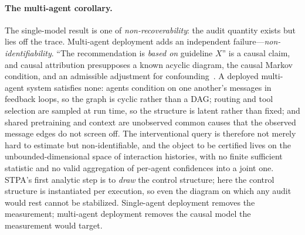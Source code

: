 \paragraph{The multi-agent corollary.} The single-model result is one of \emph{non-recoverability}: the audit quantity exists but lies off the trace. Multi-agent deployment adds an independent failure---\emph{non-identifiability}. ``The recommendation is \emph{based on} guideline $X$'' is a causal claim, and causal attribution presupposes a known acyclic diagram, the causal Markov condition, and an admissible adjustment for confounding~\cite{pearl2009}. A deployed multi-agent system satisfies none: agents condition on one another's messages in feedback loops, so the graph is cyclic rather than a DAG; routing and tool selection are sampled at run time, so the structure is latent rather than fixed; and shared pretraining and context are unobserved common causes that the observed message edges do not screen off. The interventional query is therefore not merely hard to estimate but non-identifiable, and the object to be certified lives on the unbounded-dimensional space of interaction histories, with no finite sufficient statistic and no valid aggregation of per-agent confidences into a joint one. STPA's first analytic step is to \emph{draw} the control structure; here the control structure is instantiated per execution, so even the diagram on which any audit would rest cannot be stabilized. Single-agent deployment removes the measurement; multi-agent deployment removes the causal model the measurement would target.

